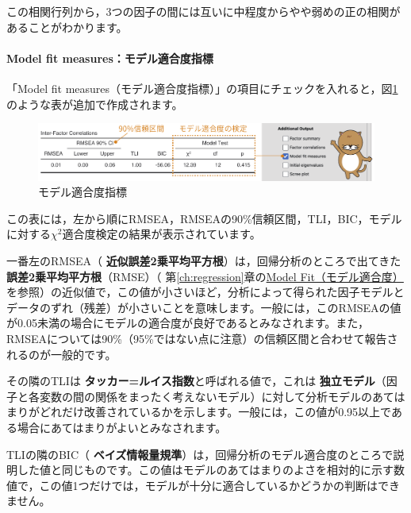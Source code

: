 \documentclass[
  12pt,
  a5jpaper,
  lualatex, ja=standard]{bxjsbook}
\renewcommand{\emph}[1]{\textbf{\color{emph} #1}}
\begin{document}
この相関行列から，3つの因子の間には互いに中程度からやや弱めの正の相関があることがわかります。

\hypertarget{subsub:factor-efa-fit-measures}{%
\paragraph*{Model fit measures：モデル適合度指標}\label{subsub:factor-efa-fit-measures}}

「Model fit measures（モデル適合度指標）」の項目にチェックを入れると，図\ref{fig:factor-efa-factor-model-fit}のような表が追加で作成されます。

\begin{figure}[!ht]

{\centering \includegraphics[width=1\linewidth]{images/factor/efa-factor-model-fit} 

}

\caption{モデル適合度指標}\label{fig:factor-efa-factor-model-fit}
\end{figure}

この表には，左から順にRMSEA，RMSEAの90\%信頼区間，TLI，BIC，モデルに対する\(\chi^2\)適合度検定の結果が表示されています。

一番左のRMSEA（\emph{近似誤差2乗平均平方根}）は，回帰分析のところで出てきた\emph{誤差2乗平均平方根}（RMSE）（ 第\ref{ch:regression}章の\protect\hyperlink{sub:regression-LR-modelfit}{Model Fit（モデル適合度）}を参照）の近似値で，この値が小さいほど，分析によって得られた因子モデルとデータのずれ（残差）が小さいことを意味します。一般には，このRMSEAの値が0.05未満の場合にモデルの適合度が良好であるとみなされます。また，RMSEAについては90\%（95\%ではない点に注意）の信頼区間と合わせて報告されるのが一般的です。

その隣のTLIは\emph{タッカー=ルイス指数}と呼ばれる値で，これは\emph{独立モデル}（因子と各変数の間の関係をまったく考えないモデル）に対して分析モデルのあてはまりがどれだけ改善されているかを示します。一般には，この値が0.95以上である場合にあてはまりがよいとみなされます。

TLIの隣のBIC（\emph{ベイズ情報量規準}）は，回帰分析のモデル適合度のところで説明した値と同じものです。この値はモデルのあてはまりのよさを相対的に示す数値で，この値1つだけでは，モデルが十分に適合しているかどうかの判断はできません。
\end{document}
